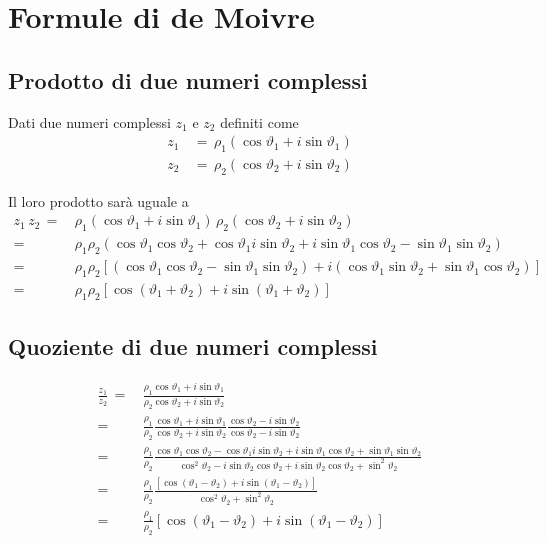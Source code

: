 \documentclass[../../dimostrazioni]{subfiles}
\begin{document}
    \chapter{Formule di de Moivre}

        \section*{Prodotto di due numeri complessi}

            Dati due numeri complessi \(z_1\) e \(z_2\) definiti come
            \begin{align*}
                z_1 \, &= \, \rho_1(\cos\vartheta_1 + i\sin\vartheta_1)\\
                z_2 \, &= \, \rho_2(\cos\vartheta_2 + i\sin\vartheta_2)
            \end{align*}

            Il loro prodotto sarà uguale a
            \begin{align*}
                z_1 \, z_2 \, =& \, \rho_1(\cos\vartheta_1+i\sin\vartheta_1) \, \rho_2(\cos\vartheta_2+i\sin\vartheta_2)\\
                       =& \, \rho_1\rho_2 (\cos\vartheta_1\cos\vartheta_2 + \cos\vartheta_1i\sin\vartheta_2 + i\sin\vartheta_1\cos\vartheta_2 - \sin\vartheta_1\sin\vartheta_2) \\
                       =& \, \rho_1\rho_2 [(\cos\vartheta_1\cos\vartheta_2 - \sin\vartheta_1\sin\vartheta_2) + i(\cos\vartheta_1 \sin\vartheta_2 + \sin\vartheta_1\cos\vartheta_2)] \\
                       =& \, \rho_1\rho_2 [\cos(\vartheta_1 + \vartheta_2) + i\sin(\vartheta_1 + \vartheta_2)]
            \end{align*}

        \section*{Quoziente di due numeri complessi}

            \begin{align*}
                \frac{z_1}{z_2} \, =& \, \frac{\rho_1\cos\vartheta_1+i\sin\vartheta_1}{\rho_2\cos\vartheta_2+i\sin\vartheta_2} \\
                                =& \, \frac{\rho_1}{\rho_2} \frac{\cos\vartheta_1+i\sin\vartheta_1}{\cos\vartheta_2+i\sin\vartheta_2} \frac{\cos\vartheta_2-i\sin\vartheta_2}{\cos\vartheta_2-i\sin\vartheta_2}\\
                                =& \, \frac{\rho_1}{\rho_2} \frac{\cos\vartheta_1\cos\vartheta_2 - \cos\vartheta_1 i\sin\vartheta_2 + i\sin\vartheta_1\cos\vartheta_2 + \sin\vartheta_1\sin\vartheta_2}{\cos^2\vartheta_2 - i\sin\vartheta_2\cos\vartheta_2 + i\sin\vartheta_2\cos\vartheta_2 + \sin^2\vartheta_2} \\
                                =& \, \frac{\rho_1}{\rho_2} \frac{[\cos(\vartheta_1 - \vartheta_2) + i\sin(\vartheta_1 - \vartheta_2)]}{\cos^2\vartheta_2 + \sin^2\vartheta_2} \\
                                =& \, \frac{\rho_1}{\rho_2} [\cos(\vartheta_1 - \vartheta_2) + i\sin(\vartheta_1 - \vartheta_2)]
            \end{align*}
\end{document}
